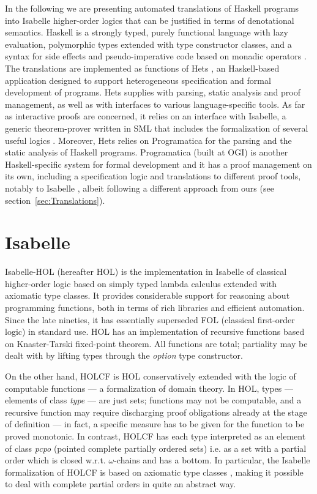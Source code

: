 \documentclass{llncs}
\begin{document}
In the following we are presenting automated translations of Haskell programs
into Isabelle higher-order logics that can be justified in terms of
denotational semantics. Haskell is a strongly typed, purely functional
language with lazy evaluation, polymorphic types extended with type
constructor classes, and a syntax for side effects and pseudo-imperative code
based on monadic operators \cite{HaskellRep}.  The translations are
implemented as functions of Hets \cite{Hets}, an Haskell-based application
designed to support heterogeneous specification and formal development of
programs. Hets supplies with parsing, static analysis and proof management, as
well as with interfaces to various language-specific tools.  As far as
interactive proofs are concerned, it relies on an interface with Isabelle, a
generic theorem-prover written in SML that includes the formalization of
several useful logics \cite{Paulson94isa}. Moreover, Hets relies on
Programatica \cite{Prog04} for the parsing and the static analysis of Haskell
programs. Programatica (built at OGI) is another Haskell-specific system for
formal development and it has a proof management on its own, including a
specification logic and translations to different proof tools, notably to
Isabelle \cite{Huff}, albeit following a different approach from ours (see
section~\ref{sec:Translations}).


\section{Isabelle}

Isabelle-HOL (hereafter HOL) is the implementation in Isabelle of classical
higher-order logic based on simply typed lambda calculus extended with
axiomatic type classes. It provides considerable support for reasoning about
programming functions, both in terms of rich libraries and efficient
automation. Since the late nineties, it has essentially superseded FOL
(classical first-order logic) in standard use. HOL has an implementation of
recursive functions based on Knaster-Tarski fixed-point theorem. All functions
are total; partiality may be dealt with by lifting types through the
\emph{option} type constructor.

On the other hand, HOLCF \cite{holcf} is HOL conservatively extended with the
logic of computable functions --- a formalization of domain theory. In HOL,
types --- elements of class \emph{type} --- are just sets; functions may not
be computable, and a recursive function may require discharging proof
obligations already at the stage of definition --- in fact, a specific measure
has to be given for the function to be proved monotonic.  In contrast, HOLCF
has each type interpreted as an element of class \emph{pcpo} (pointed complete
partially ordered sets) i.e. as a set with a partial order which is closed
w.r.t.  $\omega$-chains and has a bottom. In particular, the Isabelle
formalization of HOLCF is based on axiomatic type classes \cite{Wenzel},
making it possible to deal with complete partial orders in quite an abstract
way.
\end{document}
